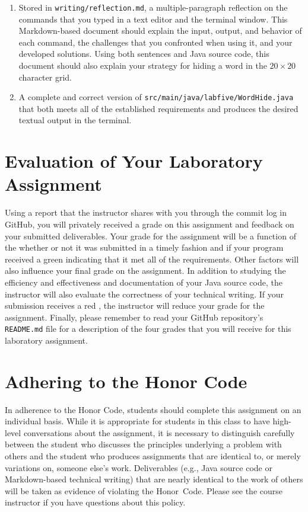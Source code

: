 \documentclass[11pt]{article}
\newcommand{\mainprogramsource}{\lstinline{src/main/java/labfive/WordHide.java}}
\newcommand{\reflection}{\lstinline{writing/reflection.md}}
\newcommand{\program}[1]{\lstinline{#1}}
\newcommand{\checkmark}{\ding{51}}
\newcommand{\naughtmark}{\ding{55}}
\begin{document}
\begin{enumerate}

  \setlength{\itemsep}{0in}

\item Stored in \reflection{}, a multiple-paragraph reflection on the commands
  that you typed in a text editor and the terminal window. This Markdown-based
  document should explain the input, output, and behavior of each command, the
  challenges that you confronted when using it, and your developed solutions.
  Using both sentences and Java source code, this document should also explain
  your strategy for hiding a word in the $20 \times 20$ character grid.

\item A complete and correct version of \mainprogramsource{} that both meets all
  of the established requirements and produces the desired textual output in the
  terminal.

\end{enumerate}

\section*{Evaluation of Your Laboratory Assignment}

Using a report that the instructor shares with you through the commit log in
GitHub, you will privately received a grade on this assignment and feedback on
your submitted deliverables. Your grade for the assignment will be a function of
the whether or not it was submitted in a timely fashion and if your program
received a green \checkmark{} indicating that it met all of the requirements.
Other factors will also influence your final grade on the assignment. In
addition to studying the efficiency and effectiveness and documentation of your
Java source code, the instructor will also evaluate the correctness of your
technical writing. If your submission receives a red \naughtmark{}, the
instructor will reduce your grade for the assignment. Finally, please remember
to read your GitHub repository's \program{README.md} file for a description of
the four grades that you will receive for this laboratory assignment.

\section*{Adhering to the Honor Code}

In adherence to the Honor Code, students should complete this assignment on an
individual basis. While it is appropriate for students in this class to have
high-level conversations about the assignment, it is necessary to distinguish
carefully between the student who discusses the principles underlying a problem
with others and the student who produces assignments that are identical to, or
merely variations on, someone else's work. Deliverables (e.g., Java source code
or Markdown-based technical writing) that are nearly identical to the work of
others will be taken as evidence of violating the \mbox{Honor Code}. Please see
the course instructor if you have questions about this policy.
\end{document}
